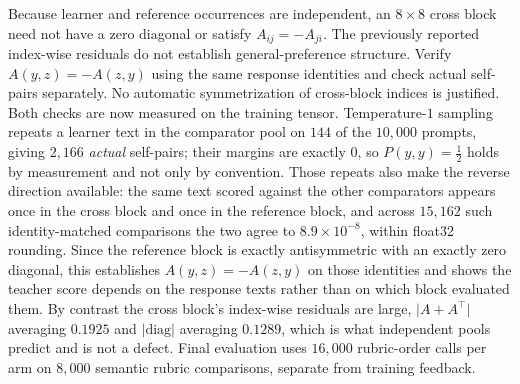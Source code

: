 \documentclass{article}
\theoremstyle{remark}
\theoremstyle{plain}
\begin{document}
Because learner and reference occurrences are independent, an $8\times8$ cross block need not have a zero diagonal or satisfy $A_{ij}=-A_{ji}$. The previously reported index-wise residuals do not establish general-preference structure. Verify $A(y,z)=-A(z,y)$ using the same response identities and check actual self-pairs separately. No automatic symmetrization of cross-block indices is justified. Both checks are now measured on the training tensor. Temperature-$1$ sampling repeats a learner text in the comparator pool on $144$ of the $10{,}000$ prompts, giving $2{,}166$ \emph{actual} self-pairs; their margins are exactly $0$, so $P(y,y)=\tfrac12$ holds by measurement and not only by convention. Those repeats also make the reverse direction available: the same text scored against the other comparators appears once in the cross block and once in the reference block, and across $15{,}162$ such identity-matched comparisons the two agree to $8.9\times10^{-8}$, within float32 rounding. Since the reference block is exactly antisymmetric with an exactly zero diagonal, this establishes $A(y,z)=-A(z,y)$ on those identities and shows the teacher score depends on the response texts rather than on which block evaluated them. By contrast the cross block's index-wise residuals are large, $\lvert A+A^{\top}\rvert$ averaging $0.1925$ and $\lvert\mathrm{diag}\rvert$ averaging $0.1289$, which is what independent pools predict and is not a defect. Final evaluation uses $16{,}000$ rubric-order calls per arm on $8{,}000$ semantic rubric comparisons, separate from training feedback.
\end{document}
